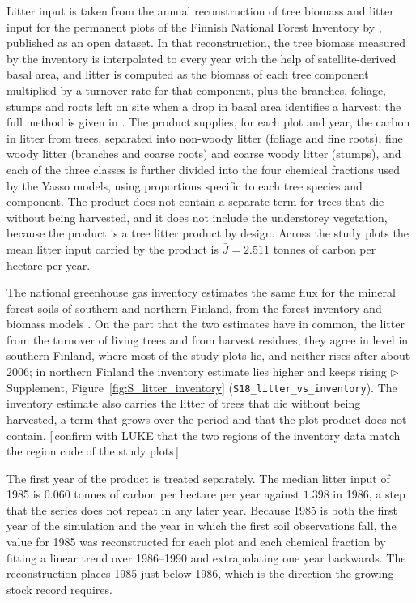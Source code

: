 \documentclass[11pt]{article}
\newcommand{\gap}[1]{\textcolor{red!70!black}{\small[\,#1\,]}}
\newcommand{\suppanchor}[2]{\textcolor{red!70!black}{\small$\triangleright$\,Supplement,
  Figure~\ref{fig:#1} (\texttt{#2})}}
\begin{document}
Litter input is taken from the annual reconstruction of tree biomass and litter input for the
permanent plots of the Finnish National Forest Inventory by \citet{TupekLitter}, published as
an open dataset. In that reconstruction, the tree biomass measured by the inventory is
interpolated to every year with the help of satellite-derived basal area, and litter is
computed as the biomass of each tree component multiplied by a turnover rate for that
component, plus the branches, foliage, stumps and roots left on site when a drop in basal
area identifies a harvest; the full method is given in \citet{TupekLitter}. The product
supplies, for each plot and year, the carbon in litter from trees, separated into non-woody
litter (foliage and fine roots), fine woody litter (branches and coarse roots) and coarse
woody litter (stumps), and each of the three classes is further divided into the four
chemical fractions used by the Yasso models, using proportions specific to each tree species
and component. The product does not contain a separate term for trees that die without being
harvested, and it does not include the understorey vegetation, because the product is a tree
litter product by design. Across the study plots the mean litter input carried by the product
is $\bar{J} = 2.511$ tonnes of carbon per hectare per year.

The national greenhouse gas inventory estimates the same flux for the mineral forest soils of
southern and northern Finland, from the forest inventory and biomass models
\citep{StatFin2025NID}. On the part that the two estimates have in common, the litter from
the turnover of living trees and from harvest residues, they agree in level in southern
Finland, where most of the study plots lie, and neither rises after about 2006; in northern
Finland the inventory estimate lies higher and keeps rising
\suppanchor{S_litter_inventory}{S18\_litter\_vs\_inventory}. The inventory estimate also carries the litter of trees
that die without being harvested, a term that grows over the period and that the plot product
does not contain. \gap{confirm with LUKE that the two regions of the inventory data match the
region code of the study plots}

The first year of the product is treated separately. The median litter input of 1985 is
$0.060$ tonnes of carbon per hectare per year against $1.398$ in 1986, a step that the series
does not repeat in any later year. Because 1985 is both the first year of the simulation and
the year in which the first soil observations fall, the value for 1985 was reconstructed for
each plot and each chemical fraction by fitting a linear trend over 1986--1990 and
extrapolating one year backwards. The reconstruction places 1985 just below 1986, which is
the direction the growing-stock record requires.
\end{document}
